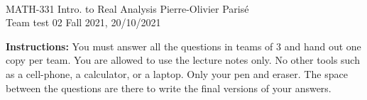 \documentclass[addpoints, 12pt]{exam}%
\theoremstyle{definition}
\begin{document}
	\noindent \hrulefill \\
	MATH-331 Intro. to Real Analysis \hfill Pierre-Olivier Paris{\'e}\\
	Team test 02 \hfill Fall 2021, 20/10/2021\\\vspace*{-0.7cm}
	
	\noindent\hrulefill
	
\vspace*{1cm}

\noindent{}
\noindent\makebox[\textwidth]{\hrulefill}

\vspace*{1cm}
\begin{center}
\gradetable[h][questions]
\end{center}
\vspace*{1cm}

{\bf Instructions:} You must answer all the questions in teams of $3$ and hand out one copy per team. You are allowed to use the lecture notes only. No other tools such as a cell-phone, a calculator, or a laptop. Only your pen and eraser. The space between the questions are there to write the final versions of your answers.


\newpage
\end{document}

